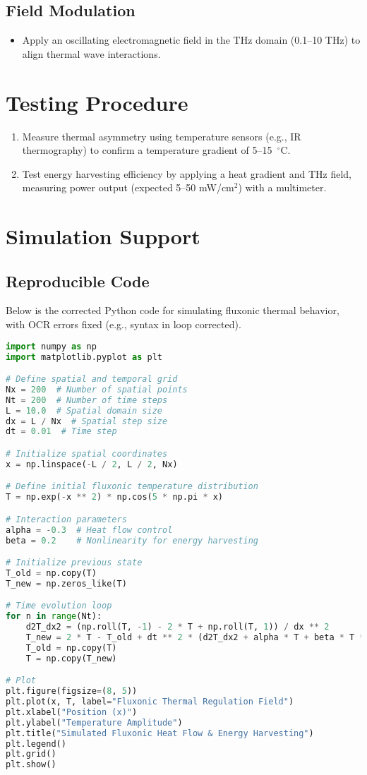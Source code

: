 \documentclass[a4paper,12pt]{article}
\begin{document}
\subsection{Field Modulation}
\begin{itemize}
    \item Apply an oscillating electromagnetic field in the THz domain (0.1--10 THz) to align thermal wave interactions.
\end{itemize}

\section{Testing Procedure}
\begin{enumerate}
    \item Measure thermal asymmetry using temperature sensors (e.g., IR thermography) to confirm a temperature gradient of 5--15~$^\circ$C.
    \item Test energy harvesting efficiency by applying a heat gradient and THz field, measuring power output (expected 5--50 mW/cm$^2$) with a multimeter.
\end{enumerate}

\section{Simulation Support}
\subsection{Reproducible Code}
Below is the corrected Python code for simulating fluxonic thermal behavior, with OCR errors fixed (e.g., syntax in loop corrected).

\begin{lstlisting}[language=Python]
import numpy as np
import matplotlib.pyplot as plt

# Define spatial and temporal grid
Nx = 200  # Number of spatial points
Nt = 200  # Number of time steps
L = 10.0  # Spatial domain size
dx = L / Nx  # Spatial step size
dt = 0.01  # Time step

# Initialize spatial coordinates
x = np.linspace(-L / 2, L / 2, Nx)

# Define initial fluxonic temperature distribution
T = np.exp(-x ** 2) * np.cos(5 * np.pi * x)

# Interaction parameters
alpha = -0.3  # Heat flow control
beta = 0.2    # Nonlinearity for energy harvesting

# Initialize previous state
T_old = np.copy(T)
T_new = np.zeros_like(T)

# Time evolution loop
for n in range(Nt):
    d2T_dx2 = (np.roll(T, -1) - 2 * T + np.roll(T, 1)) / dx ** 2
    T_new = 2 * T - T_old + dt ** 2 * (d2T_dx2 + alpha * T + beta * T ** 3)
    T_old = np.copy(T)
    T = np.copy(T_new)

# Plot
plt.figure(figsize=(8, 5))
plt.plot(x, T, label="Fluxonic Thermal Regulation Field")
plt.xlabel("Position (x)")
plt.ylabel("Temperature Amplitude")
plt.title("Simulated Fluxonic Heat Flow & Energy Harvesting")
plt.legend()
plt.grid()
plt.show()
\end{lstlisting}
\end{document}
